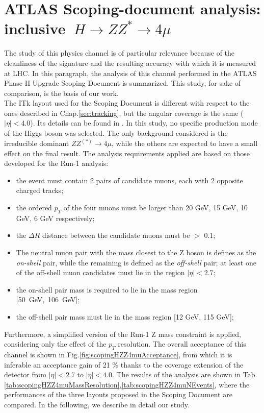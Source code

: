 \documentclass[a4paper,twoside,12pt]{book}
\begin{document}
\section{ATLAS Scoping-document analysis: \\ \mbox{inclusive $H \rightarrow ZZ^* \rightarrow 4\mu$}}\label{subsec:physics:scoping}
The study of this physics channel is of particular relevance because of the cleanliness of the signature and the resulting accuracy with which it is measured at LHC. In this paragraph, the analysis of this channel performed in the ATLAS Phase II Upgrade
Scoping Document\cite{scoping} is summarized. This study, for sake of comparison, is the basis of our work.\\

The ITk layout used for the Scoping Document is different with respect to the ones described in Chap.\ref{sec:tracking}, but the angular coverage is the same ($|\eta| < 4.0$). Its details
can be found in \cite{scoping}. In this study, no specific production mode of the Higgs boson was selected. The only background considered is the irreducible dominant $ZZ^{(*)} \rightarrow 4\mu$, while the others are
expected to have a small effect on the final result. The analysis requirements applied are based on those developed for the Run-1 analysis:

\begin{itemize}
\item the event must contain 2 pairs of candidate muons, each with 2
opposite charged tracks;
\item the ordered $p_T$ of the four muons must be larger than 20 GeV, 15 GeV, 10 GeV, 6 GeV respectively;
\item the $\Delta R$ distance between the candidate muons must be $>$ 0.1;
\item The neutral muon pair with the mass closest to the Z boson is defines as the \textit{on-shell} pair, while the remaining is defined as the \textit{off-shell} pair;
 at least one of the off-shell muon candidates must lie in the
region $|\eta| < 2.7$;	
\item the on-shell pair mass is required to lie in the mass region \mbox{[50 GeV, 106 GeV]};
\item the off-shell pair mass must lie in the mass region [12 GeV, 115 GeV];
\end{itemize}

Furthermore, a simplified version of the Run-1 Z mass constraint is applied, considering only 
the effect of the $p_T$ resolution. The overall acceptance of this channel is shown in Fig.\ref{fig:scopingHZZ4muAcceptance}, from which it is inferable an 
acceptance gain of 21 \% thanks to the coverage extension of the detector from $|\eta| < 2.7$ to 
$|\eta| < 4.0$. The results of the analysis are shown in Tab.\ref{tab:scopingHZZ4muMassResolution},\ref{tab:scopingHZZ4muNEvents}, where the 
performances of the three layouts proposed in the Scoping Document are compared. In the following, we describe in detail our study.\\
\end{document}
